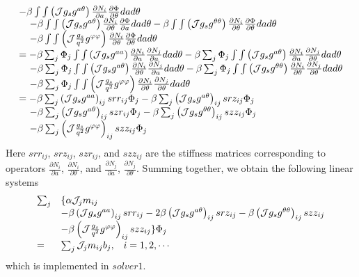 \documentclass{report}
\newcommand{\ff}[2]{\frac{#1}{#2}}
\newcommand{\pp}[2]{\frac{\partial{#1}}{\partial{#2}}}
\begin{document}
\begin{equation}
\begin{array}{l}
- \beta \int\int \left( {\cal J} g_s g^{a \theta} \right)
                 \pp{N_i}{a} \pp{\Phi}{\theta} dad\theta
\\
\;\;\;\;
- \beta \int\int \left( {\cal J} g_s g^{a \theta} \right)
                 \pp{N_i}{\theta} \pp{\Phi}{a} dad\theta
- \beta \int\int \left( {\cal J} g_s g^{\theta \theta} \right)
                 \pp{N_i}{\theta} \pp{\Phi}{\theta} dad\theta
\\
\;\;\;\;
- \beta \int\int 
      \left( {\cal J}\ff{g_s}{q^2} g^{\varphi \varphi} \right)
      \pp{N_i}{\theta} \pp{\Phi}{\theta} dad\theta
\\
=
- \beta \sum_j \Phi_j \int\int \left( {\cal J} g_s g^{a a} \right)
                 \pp{N_i}{a} \pp{N_j}{a} dad\theta
- \beta \sum_j \Phi_j \int\int \left( {\cal J} g_s g^{a \theta} \right)
                 \pp{N_i}{a} \pp{N_j}{\theta} dad\theta
\\
\;\;\;\;
- \beta \sum_j \Phi_j \int\int \left( {\cal J} g_s g^{a \theta} \right)
                 \pp{N_i}{\theta} \pp{N_j}{a} dad\theta
- \beta \sum_j \Phi_j \int\int \left( {\cal J} g_s g^{\theta \theta} \right)
                 \pp{N_i}{\theta} \pp{N_j}{\theta} dad\theta
\\
\;\;\;\;
- \beta \sum_j \Phi_j \int\int 
      \left( {\cal J}\ff{g_s}{q^2} g^{\varphi \varphi} \right)
      \pp{N_i}{\theta} \pp{N_j}{\theta} dad\theta
\\
=
- \beta \sum_j \left( {\cal J} g_s g^{a a} \right)_{ij} srr_{ij} \Phi_j 
- \beta \sum_j \left( {\cal J} g_s g^{a \theta} \right)_{ij} srz_{ij} \Phi_j
\\
\;\;\;\;
- \beta \sum_j \left( {\cal J} g_s g^{a \theta} \right)_{ij} szr_{ij} \Phi_j
- \beta \sum_j \left( {\cal J} g_s g^{\theta \theta} \right)_{ij} szz_{ij} \Phi_j
\\
\;\;\;\;
- \beta \sum_j \left( {\cal J}\ff{g_s}{q^2} g^{\varphi \varphi} \right)_{ij} szz_{ij} \Phi_j
\end{array}
\end{equation}
Here $srr_{ij}$, 
     $srz_{ij}$, 
     $szr_{ij}$, and 
     $szz_{ij}$ 
are the stiffness matrices corresponding to operators
$\pp{N_i}{a}$, $\pp{N_i}{\theta}$, and $\pp{N_j}{a}$, $\pp{N_j}{\theta}$.
Summing together, we obtain the following linear systems
\begin{equation}
\begin{array}{ll}
\sum_j & \{ \alpha {\cal J}_j m_{ij} \\
       & - \beta \left( {\cal J} g_s g^{a a} \right)_{ij} srr_{ij} 
         -2\beta \left( {\cal J} g_s g^{a \theta} \right)_{ij} srz_{ij}
         - \beta \left( {\cal J} g_s g^{\theta \theta} \right)_{ij} szz_{ij}
\\
       & - \beta \left( {\cal J}\ff{g_s}{q^2} g^{\varphi \varphi} \right)_{ij} szz_{ij}
       \} \Phi_j 
\\
= & \sum_j {\cal J}_j m_{ij} b_j, \;\;\; i= 1, 2, \cdots
\end{array}
\end{equation}
which is implemented in $solver1$.
\end{document}
